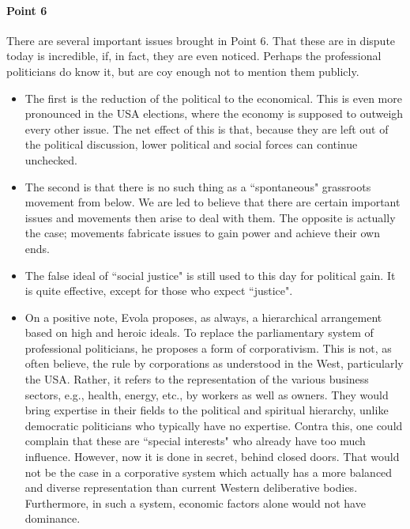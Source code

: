 \paragraph{Point 6}
\begin{quotex}
There are several important issues brought in Point 6. That these are in dispute today is incredible, if, in fact, they are even noticed. Perhaps the professional politicians do know it, but are coy enough not to mention them publicly.

\begin{itemize}
\item
The first is the reduction of the political to the economical. This is even more pronounced in the USA elections, where the economy is supposed to outweigh every other issue. The net effect of this is that, because they are left out of the political discussion, lower political and social forces can continue unchecked. 

\item
The second is that there is no such thing as a ``spontaneous" grassroots movement from below. We are led to believe that there are certain important issues and movements then arise to deal with them. The opposite is actually the case; movements fabricate issues to gain power and achieve their own ends. 

\item
The false ideal of ``social justice" is still used to this day for political gain. It is quite effective, except for those who expect ``justice". 

\item
On a positive note, Evola proposes, as always, a hierarchical arrangement based on high and heroic ideals. To replace the parliamentary system of professional politicians, he proposes a form of corporativism. This is not, as often believe, the rule by corporations as understood in the West, particularly the USA. Rather, it refers to the representation of the various business sectors, e.g., health, energy, etc., by workers as well as owners. They would bring expertise in their fields to the political and spiritual hierarchy, unlike democratic politicians who typically have no expertise. Contra this, one could complain that these are ``special interests" who already have too much influence. However, now it is done in secret, behind closed doors. That would not be the case in a corporative system which actually has a more balanced and diverse representation than current Western deliberative bodies. Furthermore, in such a system, economic factors alone would not have dominance. 
\end{itemize}
\end{quotex}
